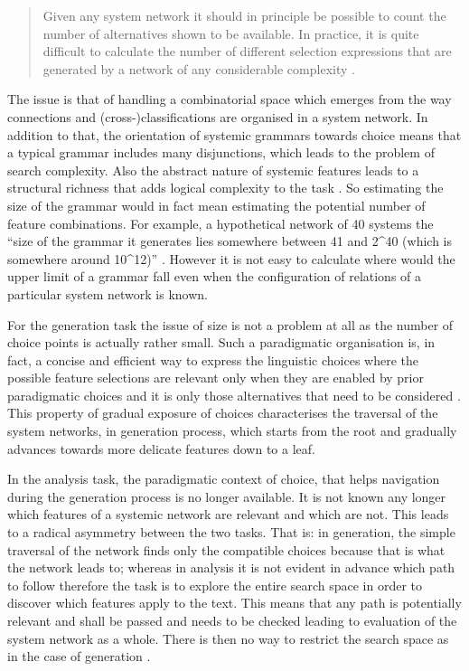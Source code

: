\begin{quote}
    Given any system network it should in principle be possible to count the number of alternatives shown to be available. In practice, it is quite difficult to calculate the number of different selection expressions that are generated by a network of any considerable complexity \citep[10]{Halliday96-grammatics}.
\end{quote}

The issue is that of handling a combinatorial space which emerges from the way connections and (cross-)classifications are organised in a system network. In addition to that, the orientation of systemic grammars towards choice means that a typical grammar includes many disjunctions, which leads to the problem of search complexity. Also the abstract nature of systemic features leads to a structural richness that adds logical complexity to the task \citep{ODonnell1993}. So estimating the size of the grammar would in fact mean estimating the potential number of feature combinations. For example, a hypothetical network of 40 systems the ``size of the grammar it generates lies somewhere between 41 and 2^{40} (which is somewhere around 10^{12})'' \citep[28]{Bateman2008}. However it is not easy to calculate where would the upper limit of a grammar fall even when the configuration of relations of a particular system network is known.

For the generation task the issue of size is not a problem at all as the number of choice points is actually rather small. Such a paradigmatic organisation is, in fact, a concise and efficient way to express the linguistic choices where the possible feature selections are relevant only when they are enabled by prior paradigmatic choices and it is only those alternatives that need to be considered \citep[12--13]{Halliday96-grammatics}. This property of gradual exposure of choices characterises the traversal of the system networks, in generation process, which starts from the root and gradually advances towards more delicate features down to a leaf.

In the analysis task, the paradigmatic context of choice, that helps navigation during the generation process is no longer available. It is not known
any longer which features of a systemic network are relevant and which are not. This leads to a radical asymmetry between the two tasks. That
is: in generation, the simple traversal of the network finds only the compatible choices
because that is what the network leads to; whereas in analysis it is not evident in
advance which path to follow therefore the task is to explore the entire search
space in order to discover which features apply to the text. This means that any path is potentially relevant and shall be passed and needs to be checked leading to evaluation of the system network as a whole. There is then no way to restrict the search space as in the case of generation \citep[29]{Bateman2008}. 

